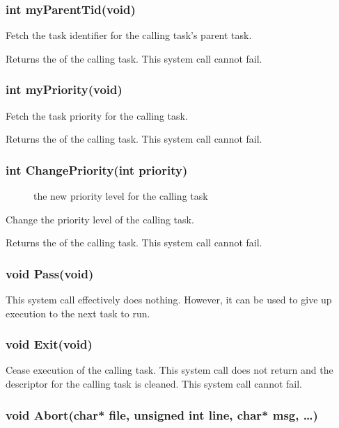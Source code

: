 \documentclass[pdftex,10pt,a4paper]{article}
\begin{document}
\subsubsection*{int myParentTid(void)}

Fetch the task identifier for the calling task's parent task.

Returns the  of the calling task. This system call cannot fail.


\subsubsection*{int myPriority(void)}

Fetch the task priority for the calling task.

Returns the  of the calling task. This system call cannot fail.


\subsubsection*{int ChangePriority(int priority)}

\begin{description}
\item[] the new priority level for the calling task
\end{description}

Change the priority level of the calling task.

Returns the  of the calling task. This system call cannot fail.


\subsubsection*{void Pass(void)}

This system call effectively does nothing. However, it can be used to
give up execution to the next task to run.


\subsubsection*{void Exit(void)}

Cease execution of the calling task. This system call does not return
and the descriptor for the calling task is cleaned. This system call
cannot fail.


\subsubsection*{void Abort(char* file, unsigned int line, char* msg, \ldots)}
\end{document}
